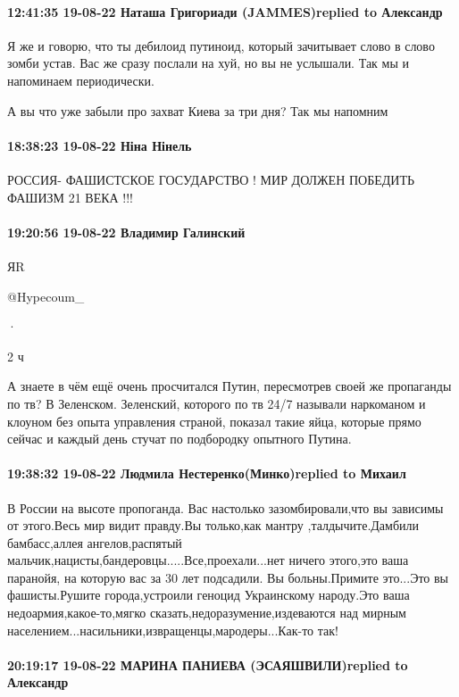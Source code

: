 \paragraph{12:41:35 19-08-22 Наташа Григориади (JAMMES)replied to Александр}

Я же и говорю, что ты дебилоид путиноид, который зачитывает слово в слово зомби
устав. Вас же сразу послали на хуй, но вы не услышали. Так мы и напоминаем
периодически.

А вы что уже забыли про захват Киева за три дня? Так мы напомним

\paragraph{18:38:23 19-08-22 Ніна Нінель}

РОССИЯ- ФАШИСТСКОЕ ГОСУДАРСТВО ! МИР ДОЛЖЕН ПОБЕДИТЬ ФАШИЗМ 21 ВЕКА !!!

\paragraph{19:20:56 19-08-22 Владимир Галинский}

ЯR

@Hypecoum_

·

2 ч

А знаете в чём ещё очень просчитался Путин, пересмотрев своей же пропаганды по
тв? В Зеленском. Зеленский, которого по тв 24/7 называли наркоманом и клоуном
без опыта управления страной, показал такие яйца, которые прямо сейчас и каждый
день стучат по подбородку опытного Путина.

\paragraph{19:38:32 19-08-22 Людмила Нестеренко(Минко)replied to Михаил}

В России на высоте пропоганда. Вас настолько зазомбировали,что вы зависимы от
этого.Весь мир видит правду.Вы только,как мантру ,талдычите.Дамбили
бамбасс,аллея ангелов,распятый
мальчик,нацисты,бандеровцы.....Все,проехали...нет ничего этого,это ваша
паранойя, на которую вас за 30 лет подсадили. Вы больны.Примите это...Это вы
фашисты.Рушите города,устроили геноцид Украинскому народу.Это ваша
недоармия,какое-то,мягко сказать,недоразумение,издеваются над мирным
населением...насильники,извращенцы,мародеры...Как-то так!

\paragraph{20:19:17 19-08-22 МАРИНА ПАНИЕВА (ЭСАЯШВИЛИ)replied to Александр}

